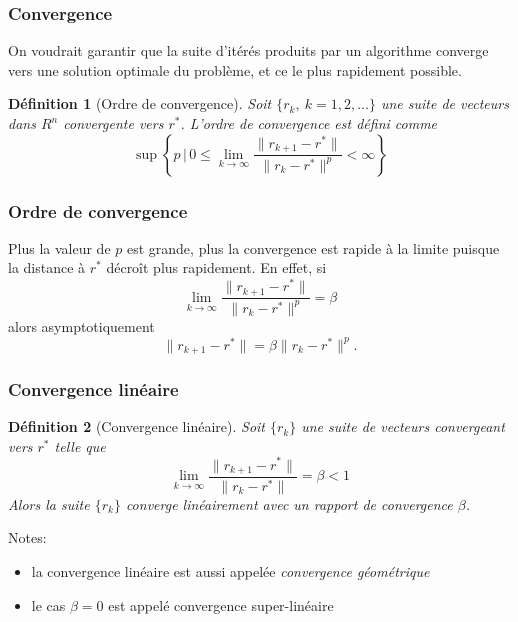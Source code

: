 \documentclass[usepdftitle=false]{beamer}
\newtheorem{defn}{Définition}
\begin{document}
\begin{frame}
\frametitle{Convergence}

On voudrait garantir que la suite d'itérés produits par un algorithme converge vers une solution optimale du problème, et ce le plus rapidement possible.

\mbox{}

\begin{defn}[Ordre de convergence]
Soit $\lbrace r_k,\ k=1,2,\ldots \rbrace$ une suite de vecteurs dans $R^n$ convergente vers $r^*$.
	L'ordre de convergence est défini comme
	$$
	\sup \left\{ p \,\Big|\, 0 \leq \lim_{k \rightarrow \infty} \frac{ \| r_{k+1} - r^* \| }{\| r_k - r^* \|^p } < \infty \right\}
	$$
\end{defn}


\end{frame}

\begin{frame}
\frametitle{Ordre de convergence}

Plus la valeur de $p$ est grande, plus la convergence est rapide à la limite
puisque la distance à $r^*$ décroît plus rapidement.
En effet, si
$$
\lim_{k \rightarrow \infty} \frac{\| r_{k+1}-r^* \|}{\| r_k-r^* \|^p} = \beta
$$
alors asymptotiquement
$$
\| r_{k+1}-r^* \| = \beta {\| r_k-r^* \|^p}.
$$

\end{frame}

\begin{frame}
\frametitle{Convergence linéaire}

\begin{defn}[Convergence linéaire]
Soit $\{ r_k \}$ une suite de vecteurs convergeant vers $r^*$ telle que
$$
\lim_{k \rightarrow \infty} \frac{ \| r_{k+1} - r^* \| }{\| r_k - r^* \| } = \beta < 1
$$
Alors la suite $\{ r_k \}$ converge linéairement avec un rapport de convergence $\beta$. 
\end{defn}

\mbox{}

Notes:
\begin{itemize}
\item
la convergence linéaire est aussi appelée {\sl convergence géométrique}
\item
le cas $\beta = 0$ est appelé convergence super-linéaire
\end{itemize}

\end{frame}
\end{document}
